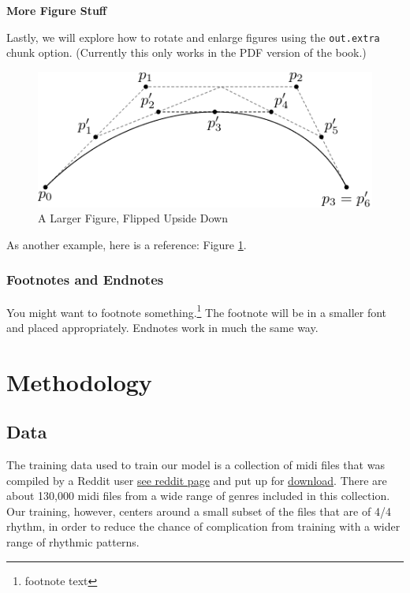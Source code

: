 \documentclass[12pt,oneside]{chicagocapstone}
\begin{document}
\textbf{More Figure Stuff}

Lastly, we will explore how to rotate and enlarge figures using the \texttt{out.extra} chunk option. (Currently this only works in the PDF version of the book.)
\begin{figure}
\includegraphics[angle=180, scale=1.1]{figure/subdivision} \caption{A Larger Figure, Flipped Upside Down}\label{fig:subd2}
\end{figure}
As another example, here is a reference: Figure \ref{fig:subd2}.

\hypertarget{footnotes-and-endnotes}{%
\subsection*{Footnotes and Endnotes}\label{footnotes-and-endnotes}}

You might want to footnote something.\footnote{footnote text} The footnote will be in a smaller font and placed appropriately. Endnotes work in much the same way.

\hypertarget{methodology}{%
\chapter*{Methodology}\label{methodology}}

\hypertarget{methodology-data}{%
\section*{Data}\label{methodology-data}}

The training data used to train our model is a collection of midi files that was compiled by a Reddit user \href{https://www.reddit.com/r/WeAreTheMusicMakers/comments/3ajwe4/the_largest_midi_collection_on_the_internet/}{see reddit page} and put up for \href{https://mega.co.nz/\#!Elg1TA7T!MXEZPzq9s9YObiUcMCoNQJmCbawZqzAkHzY4Ym6Gs_Q}{download}. There are about 130,000 midi files from a wide range of genres included in this collection. Our training, however, centers around a small subset of the files that are of 4/4 rhythm, in order to reduce the chance of complication from training with a wider range of rhythmic patterns.
\end{document}
